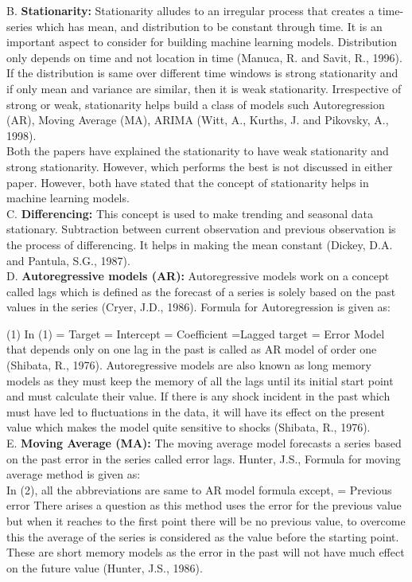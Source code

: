 \documentclass[12pt,a4paper]{article}
\begin{document}
\begin{flushleft}
		B.	\textbf{Stationarity:}
		Stationarity alludes to an irregular process that creates a time-series which has mean, and distribution to be constant through time. It is an important aspect to consider for building machine learning models. Distribution only depends on time and not location in time (Manuca, R. and Savit, R., 1996). If the distribution is same over different time windows is strong stationarity and if only mean and variance are similar, then it is weak stationarity. Irrespective of strong or weak, stationarity helps build a class of models such Autoregression (AR), Moving Average (MA), ARIMA (Witt, A., Kurths, J. and Pikovsky, A., 1998). \\
		Both the papers have explained the stationarity to have weak stationarity and strong stationarity. However, which performs the best is not discussed in either paper. However, both have stated that the concept of stationarity helps in machine learning models.\\
		C.	\textbf{Differencing:}
		This concept is used to make trending and seasonal data stationary. Subtraction between current observation and previous observation is the process of differencing. It helps in making the mean constant (Dickey, D.A. and Pantula, S.G., 1987). \\
		D.	\textbf{Autoregressive models (AR):}
		Autoregressive models work on a concept called lags which is defined as the forecast of a series is solely based on the past values in the series (Cryer, J.D., 1986). Formula for Autoregression is given as:
		
		(1)
		In (1) 	  = Target
		= Intercept
		= Coefficient
		=Lagged target
		= Error
		Model that depends only on one lag in the past is called as AR model of order one (Shibata, R., 1976). Autoregressive models are also known as long memory models as they must keep the memory of all the lags until its initial start point and must calculate their value. If there is any shock incident in the past which must have led to fluctuations in the data, it will have its effect on the present value which makes the model quite sensitive to shocks (Shibata, R., 1976). \\
		
		
		E.	\textbf{Moving Average (MA):}
		The moving average model forecasts a series based on the past error in the series called error lags. Hunter, J.S., Formula for moving average method is given as:\\
		
		In (2), all the abbreviations are same to AR model formula except,   = Previous error
		There arises a question as this method uses the error for the previous value but when it reaches to the first point there will be no previous value, to overcome this the average of the series is considered as the value before the starting point. These are short memory models as the error in the past will not have much effect on the future value (Hunter, J.S., 1986).
		

\end{flushleft}
\end{document}
